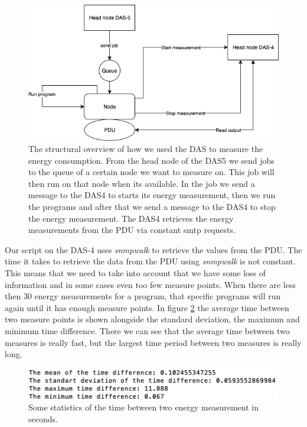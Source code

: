 \begin{figure}[h]
    \centering
    \includegraphics[width=.6\textwidth]{graphs/das.png}
    \caption{The structural overview of how we used the DAS to measure the energy consumption. From the head node of the DAS5 we send jobs to the queue of a certain node we want to measure on. This job will then run on that node when its available. In the job we send a message to the DAS4 to starts its energy measurement, then we run the programs and after that we send a message to the DAS4 to stop the energy measurement. The DAS4 retrieves the energy measurements from the PDU via constant smtp requests.}
    \label{fig:overview}
\end{figure}

Our script on the DAS-4 uses \textit{snmpwalk} to retrieve the values from the PDU. The time it takes to retrieve the data from the PDU using \textit{snmpwalk} is not constant. This means that we need to take into account that we have some loss of information and in some cases even too few measure points. When there are less then 30 energy measurements for a program, that specific programs will run again until it has enough measure points. In figure \ref{fig:time_diff} the average time between two measure points is shown alongside the standard deviation, the maximum and minimum time difference. There we can see that the average time between two measures is really fast, but the largest time period between two measures is really long. 

\begin{figure}[h]
    \centering
    \includegraphics[width=.6\textwidth]{graphs/time_between_measures.png}
    \caption{Some statistics of the time between two energy measurement in seconds.}
    \label{fig:time_diff}
\end{figure}

